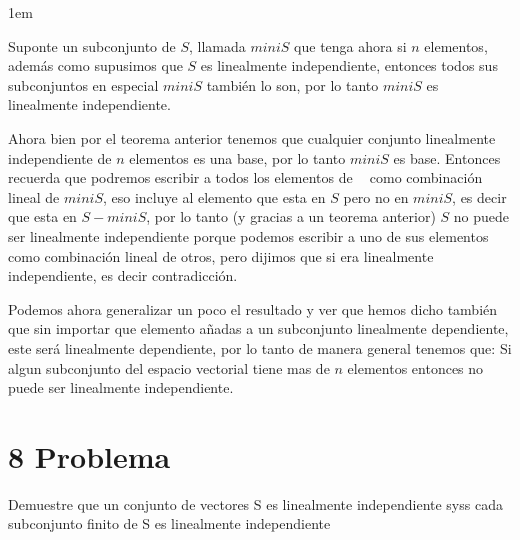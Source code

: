 \documentclass[12pt, fleqn]{article}                             %
\newenvironment{SmallIndentation}[1][0.75em]                    %
        {\begin{adjustwidth}{#1}{}\begin{footnotesize}}             %
        {\end{footnotesize}\end{adjustwidth}}                       %
\theoremstyle{break}                                            %
\DeclareMathOperator \GenericField {\mathbb{F}}                 %
\DeclareMathOperator \VectorSet    {\mathbb{V}}                 %
\DeclareMathOperator \VectorSpace  {\VectorSet_{\GenericField}} %
\begin{document}
\begin{itemize}
\begin{SmallIndentation}[1em]
                Suponte un subconjunto de $S$, llamada $miniS$ que tenga ahora si $n$ elementos, 
                además como supusimos que $S$ es linealmente independiente, entonces todos sus subconjuntos
                en especial $miniS$ también lo son, por lo tanto $miniS$ es linealmente independiente.

                Ahora bien por el teorema anterior tenemos que cualquier conjunto linealmente independiente
                de $n$ elementos es una base, por lo tanto $miniS$ es base.
                Entonces recuerda que podremos escribir a todos los elementos de $\VectorSpace$ como combinación
                lineal de $miniS$, eso incluye al elemento que esta en $S$ pero no en $miniS$, es decir que esta en
                $S - miniS$, por lo tanto (y gracias a un teorema anterior) $S$ no puede ser linealmente independiente
                porque podemos escribir a uno de sus elementos como combinación lineal de otros, pero dijimos que si era
                linealmente independiente, es decir contradicción.

                Podemos ahora generalizar un poco el resultado y ver que hemos dicho también que sin importar que elemento
                añadas a un subconjunto linealmente dependiente, este será linealmente dependiente, por lo tanto de manera
                general tenemos que:
                Si algun subconjunto del espacio vectorial tiene mas de $n$ elementos entonces no puede ser linealmente
                independiente.
            
            \end{SmallIndentation}

    \end{itemize}



\clearpage
\section{8 Problema}

    Demuestre que un conjunto de vectores S es linealmente independiente
    syss cada subconjunto finito de S es linealmente independiente
    
\end{document}
